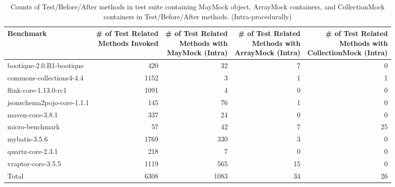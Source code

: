 \begin{table*}[b]
	\centering
	\caption{Counts of Test/Before/After methods in test suite containing MayMock object, ArrayMock containers, and CollectionMock containers in Test/Before/After methods. (Intra-procedurally)}
	\begin{tabular}{lrrrr}
		\toprule
		Benchmark & \thead{\# of Test Related \\ Methods Invoked} & \thead{\# of Test Related \\ Methods with \\ MayMock (Intra)}  & \thead{\# of Test Related \\ Methods with \\ ArrayMock (Intra)} & \thead{\# of Test Related \\ Methods with \\ CollectionMock (Intra)} \\
		\midrule
		bootique-2.0.B1-bootique           		&  420        &  32  & 7 & 0       \\
		commons-collections4-4.4          		&  1152       &  3   & 1 & 1       \\
		flink-core-1.13.0-rc1           		&  1091       &  4   & 0 & 0       \\
		jsonschema2pojo-core-1.1.1           	&  145        &  76  & 1 & 0       \\
		maven-core-3.8.1	           			&  337        &  24  & 0 & 0       \\
		micro-benchmark         		  		&  57         &  42  & 7 & 25       \\
		mybatis-3.5.6         		  			&  1769       &  330 & 3 & 0       \\
		
		quartz-core-2.3.1         	  			&  218     	  &  7   & 0 & 0      \\
		vraptor-core-3.5.5         	  			&  1119       &  565 & 15 & 0      \\
		\bottomrule
		Total        	  						&  6308       &  1083  & 34 & 26    \\
	\end{tabular}
	\label{tab:mocks}
\end{table*}


